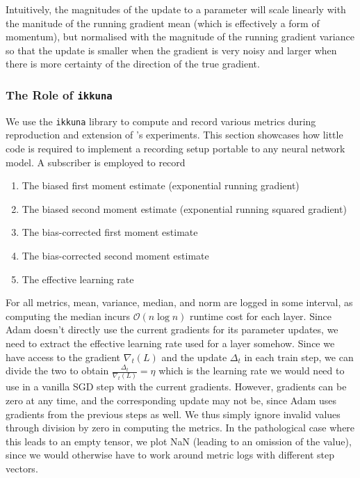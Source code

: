 Intuitively, the magnitudes of the update to a parameter will scale linearly
with the manitude of the running gradient mean (which is effectively a form of
momentum), but normalised with the magnitude of the running gradient variance so
that the update is smaller when the gradient is very noisy and larger when there
is more certainty of the direction of the true gradient.

\subsubsection{The Role of \texttt{ikkuna}}%
\label{sub:use_of_ikkuna_for_optimiser_research}

We use the \texttt{ikkuna} library to compute and record various metrics during
reproduction and extension of \citeauthor{kingma2014adam}'s experiments. This
section showcases how little code is required to implement a recording setup
portable to any neural network model. A subscriber is employed to record
\begin{enumerate}
    \item The biased first moment estimate (exponential running gradient)
    \item The biased second moment estimate (exponential running squared
        gradient)
    \item The bias-corrected first moment estimate
    \item The bias-corrected second moment estimate
    \item The effective learning rate
\end{enumerate}

For all metrics, mean, variance, median, and norm are logged in some interval,
as computing the median incurs $\mathcal{O}(n\log n)$ runtime cost for each
layer. Since Adam doesn't directly use the current gradients for its parameter
updates, we need to extract the effective learning rate used for a layer
somehow. Since we have access to the gradient $\nabla_t(L)$ and the update
$\Delta_t$ in each train step, we can divide the two to obtain
$\frac{\Delta_t}{\nabla_t(L)}=\eta$ which is the learning rate we would need to
use in a vanilla SGD step with the current gradients. However, gradients can be
zero at any time, and the corresponding update may not be, since Adam uses
gradients from the previous steps as well. We thus simply ignore invalid values
through division by zero in computing the metrics. In the pathological case
where this leads to an empty tensor, we plot NaN (leading to an omission of the
value), since we would otherwise have to work around metric logs with different
step vectors.

